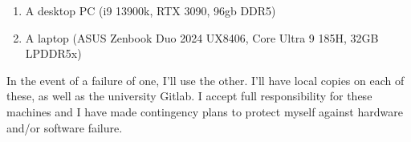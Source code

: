 \documentclass{article}
\begin{document}
\begin{enumerate}
    \item A desktop PC (i9 13900k, RTX 3090, 96gb DDR5)
    \item A laptop (ASUS Zenbook Duo 2024 UX8406, Core Ultra 9 185H, 32GB LPDDR5x)
\end{enumerate}

In the event of a failure of one, I’ll use the other. I’ll have local copies on each of these, as well as the university Gitlab.
I accept full responsibility for these machines and I have made contingency plans to protect myself against hardware and/or software failure.

\printbibliography
\end{document}
